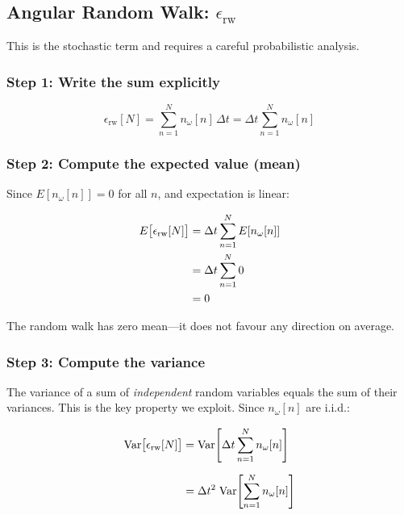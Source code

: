 \subsection{Angular Random Walk: $\epsilon_\text{rw}$}
\label{app:rw}

This is the stochastic term and requires a careful probabilistic analysis.

\subsubsection{Step 1: Write the sum explicitly}

\begin{equation}
  \epsilon_\text{rw}[N]
  = \sum_{n=1}^{N} n_\omega[n]\,\Delta t
  = \Delta t \sum_{n=1}^{N} n_\omega[n]
  \label{eq:app:rw_sum}
\end{equation}

\subsubsection{Step 2: Compute the expected value (mean)}

Since $E[n_\omega[n]] = 0$ for all $n$, and expectation is linear:

\begin{align}
  E\bigl[\epsilon_\text{rw}[N]\bigr]
  &= \Delta t \sum_{n=1}^{N} E[n_\omega[n]] \notag \\
  &= \Delta t \sum_{n=1}^{N} 0 \notag \\
  &= 0
  \label{eq:app:rw_mean}
\end{align}

\noindent The random walk has zero mean---it does not favour any direction on
average.

\subsubsection{Step 3: Compute the variance}

The variance of a sum of \emph{independent} random variables equals the sum of
their variances. This is the key property we exploit. Since $n_\omega[n]$ are
i.i.d.:

\begin{align}
  \text{Var}\bigl[\epsilon_\text{rw}[N]\bigr]
  &= \text{Var}\!\left[\Delta t \sum_{n=1}^{N} n_\omega[n]\right] \notag \\[6pt]
  &= \Delta t^2 \;\text{Var}\!\left[\sum_{n=1}^{N} n_\omega[n]\right]
  \label{eq:app:rw_var_step1}
\end{align}


